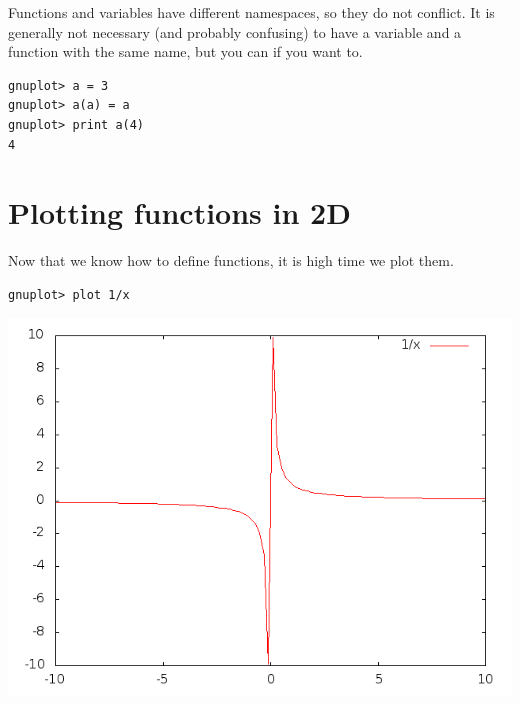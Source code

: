 \documentclass[11pt,letterpaper]{report}
\begin{document}
Functions and variables have different namespaces, so they do not conflict. It is generally not necessary (and probably confusing) to have a variable and a function with the same name, but you can if you want to.

\begin{verbatim}
gnuplot> a = 3
gnuplot> a(a) = a
gnuplot> print a(4)
4
\end{verbatim}


%
%



\chapter{Plotting functions in 2D}

Now that we know how to define functions, it is high time we plot them.

\begin{verbatim}
gnuplot> plot 1/x
\end{verbatim}
\includegraphics[width=150mm]{1divx.png}
\end{document}
